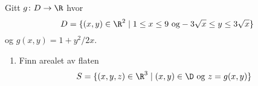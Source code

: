 
\oppgave[V015, Oppgave 5]

Gitt $g \colon D \to \R$ hvor
%
\begin{equation*}
  D = \{ (x,y) \in \R^2 \mid 1 \leq x \leq 9 \ \text{og} -3\sqrt{x} \leq y \leq 3 \sqrt{x} \}
\end{equation*}
%
og $g(x, y) = 1 + y^2/2x$.

\begin{enumerate}
  \item Finn arealet av flaten
    \begin{equation*}
      S = \{ (x,y,z) \in \R^3 \mid (x,y) \in \D \ \text{og} \ z = g(x,y) \}
    \end{equation*}
\end{enumerate}



